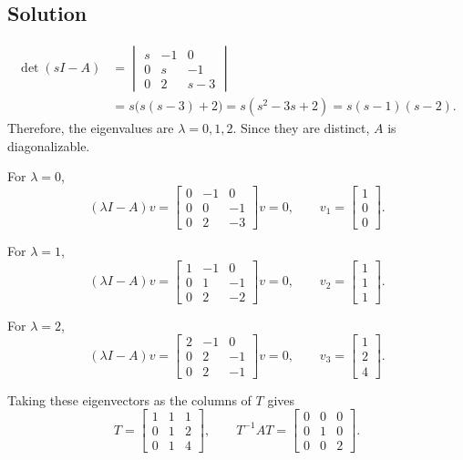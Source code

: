 \documentclass[12pt,a4paper]{article}
\begin{document}
\subsection*{Solution}

\begin{align*}
\det (sI - A) &= \begin{vmatrix}
 s & -1 & 0 \\
 0 & s & -1 \\
 0 & 2 & s - 3
\end{vmatrix} \\
&= s\bigl(s(s - 3) + 2\bigr) = s(s^2 - 3s + 2) = s(s - 1)(s - 2).
\end{align*}
Therefore, the eigenvalues are $\lambda=0,1,2$. Since they are distinct, $A$ is diagonalizable.

For $\lambda = 0$,
\[
(\lambda I - A)v = \begin{bmatrix}
 0 & -1 & 0 \\
 0 & 0 & -1 \\
 0 & 2 & -3
\end{bmatrix}v = 0, \qquad v_1 = \begin{bmatrix}1 \\ 0 \\ 0\end{bmatrix}.
\]

For $\lambda = 1$,
\[
(\lambda I - A)v = \begin{bmatrix}
 1 & -1 & 0 \\
 0 & 1 & -1 \\
 0 & 2 & -2
\end{bmatrix}v = 0, \qquad v_2 = \begin{bmatrix}1 \\ 1 \\ 1\end{bmatrix}.
\]

For $\lambda = 2$,
\[
(\lambda I - A)v = \begin{bmatrix}
 2 & -1 & 0 \\
 0 & 2 & -1 \\
 0 & 2 & -1
\end{bmatrix}v = 0, \qquad v_3 = \begin{bmatrix}1 \\ 2 \\ 4\end{bmatrix}.
\]

Taking these eigenvectors as the columns of $T$ gives
\[
T = \begin{bmatrix}
1 & 1 & 1 \\
0 & 1 & 2 \\
0 & 1 & 4
\end{bmatrix},
\qquad T^{-1}AT = \begin{bmatrix}
0 & 0 & 0 \\
0 & 1 & 0 \\
0 & 0 & 2
\end{bmatrix}.
\]
\end{document}
